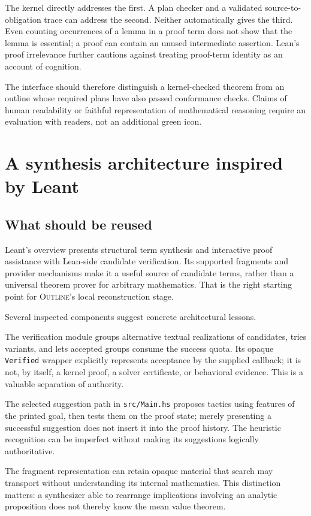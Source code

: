 \documentclass[11pt,a4paper]{article}
\newcommand{\code}[1]{\nolinkurl{#1}}
\newcommand{\Outline}{\textsc{Outline}}
\theoremstyle{definition}
\theoremstyle{remark}
\numberwithin{equation}{section}
\begin{document}
The kernel directly addresses the first. A plan checker and a validated source-to-obligation trace can address the second. Neither automatically gives the third. Even counting occurrences of a lemma in a proof term does not show that the lemma is essential; a proof can contain an unused intermediate assertion. Lean's proof irrelevance further cautions against treating proof-term identity as an account of cognition.

The interface should therefore distinguish a kernel-checked theorem from an outline whose required plans have also passed conformance checks. Claims of human readability or faithful representation of mathematical reasoning require an evaluation with readers, not an additional green icon.

\section{A synthesis architecture inspired by Leant}
\label{sec:leant}
\subsection{What should be reused}
Leant's overview presents structural term synthesis and interactive proof assistance with Lean-side candidate verification. Its supported fragments and provider mechanisms make it a useful source of candidate terms, rather than a universal theorem prover for arbitrary mathematics. That is the right starting point for \Outline's local reconstruction stage.\cite{l-readme}

Several inspected components suggest concrete architectural lessons.

The verification module groups alternative textual realizations of candidates, tries variants, and lets accepted groups consume the success quota. Its opaque \code{Verified} wrapper explicitly represents acceptance by the supplied callback; it is not, by itself, a kernel proof, a solver certificate, or behavioral evidence. This is a valuable separation of authority.\cite{l-verification}

The selected suggestion path in \code{src/Main.hs} proposes tactics using features of the printed goal, then tests them on the proof state; merely presenting a successful suggestion does not insert it into the proof history. The heuristic recognition can be imperfect without making its suggestions logically authoritative.\cite{l-main}

The fragment representation can retain opaque material that search may transport without understanding its internal mathematics. This distinction matters: a synthesizer able to rearrange implications involving an analytic proposition does not thereby know the mean value theorem.\cite{l-fragment}
\end{document}
